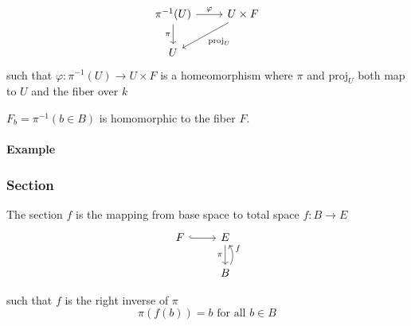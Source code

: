 \documentclass[../main.tex]{subfiles}
\begin{document}
\begin{equation}
    \label{eq:fiber_local_trivial}
    \begin{tikzcd}
        \pi^{-1}(U) \arrow[r, "\varphi"] \arrow[d, "\pi"'] & U \times F \arrow[ld, "\mathrm{proj}_U"] \\
        U                                                  &                                         
    \end{tikzcd}
\end{equation}
such that $\varphi: \pi^{-1}(U) \rightarrow U \times F$ is a homeomorphism where $\pi$ and $\mathrm{proj}_U$ both map to $U$ and the fiber over $k$


$F_b = \pi^{-1}({b \in B}) $ is homomorphic to the fiber $F$.


\paragraph{Example}



\subsubsection{Section}
\label{sec:section_data}
The section $f$ is the mapping from base space to total space $f: B\rightarrow E$ 
\begin{equation}
    \label{eq:section}
    \begin{tikzcd}
        F \arrow[r, hook] & E \arrow[d, "\pi"']           \\
        & B \arrow[u, "f"', bend right]
    \end{tikzcd}
\end{equation}

such that $f$ is the right inverse of $\pi$
\begin{equation}
    \label{eq:section_domain}
    \pi(f(b)) = b \text{ for all } b \in B 
\end{equation}
\end{document}
